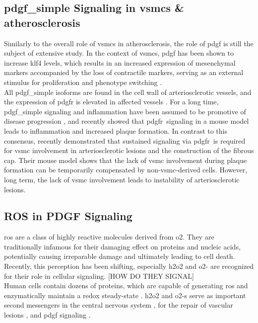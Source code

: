     \subsection{\ac{pdgf_simple} Signaling in \acp{vsmc} \& atherosclerosis}
    \label{subsec:pdgf_in_disease}
    Similarly to the overall role of \acp{vsmc} in atherosclerosis, the role of \ac{pdgf} is still the subject of extensive study. In the context of \acp{vsmc}, \ac{pdgf} has been shown to increase \ac{klf4} levels, which results in an increased expression of mesenchymal markers accompanied by the loss of contractile markers, serving as an external stimulus for proliferation and phenotype switching \cite{yapSixShadesVascular2021}.\\
    All \ac{pdgf_simple} isoforms are found in the cell wall of arteriosclerotic vessels, and the expression of \ac{pdgfr} is elevated in affected vessels \cite{huTargetingPlateletderivedGrowth2015}. For a long time, \ac{pdgf_simple} signaling and inflammation have been assumed to be promotive of disease progression \cite{andraeRolePlateletderivedGrowth2008, chenPlateletderivedGrowthFactors2013, huTargetingPlateletderivedGrowth2015}, and recently \textcite{hePDGFRvSignallingRegulates2015} showed that \ac{pdgfr}\beta~signaling in a mouse model leads to inflammation and increased plaque formation. In contrast to this consensus, \textcite{newmanMultipleCellTypes2021} recently demonstrated that sustained signaling via \ac{pdgfr}\beta~is required for \ac{vsmc} involvement in arteriosclerotic lesions and the construction of the fibrous cap. Their mouse model shows that the lack of \ac{vsmc} involvement during plaque formation can be temporarily compensated by non-\ac{vsmc}-derived cells. However, long term, the lack of \ac{vsmc} involvement leads to instability of arteriosclerotic lesions.

    \subsection{ROS in PDGF Signaling}
    \label{subsec:ROS_signaling}
    \Ac{ros} are a class of highly reactive molecules derived from \ac{o2}. They are traditionally infamous for their damaging effect on proteins and nucleic acids, potentially causing irreparable damage and ultimately leading to cell death. Recently, this perception has been shifting, especially \ac{h2o2} and \ac{o2-} are recognized for their role in cellular signaling. \cite{siesReactiveOxygenSpecies2020} [HOW DO THEY SIGNAL] \\
    Human cells contain dozens of proteins, which are capable of generating \ac{ros} and enzymatically maintain a redox steady-state \cite{siesReactiveOxygenSpecies2020}. \ac{h2o2} and \acp{o2-} serve as important second messengers in the central nervous system \cite{nayerniaNewInsightsNOX2014}, for the repair of vascular lesions \cite{andraeRolePlateletderivedGrowth2008}, and \ac{pdgf} signaling \cite{sundaresanRequirementGenerationH2O21995, bouziguesRegulationROSResponse2014a}.


